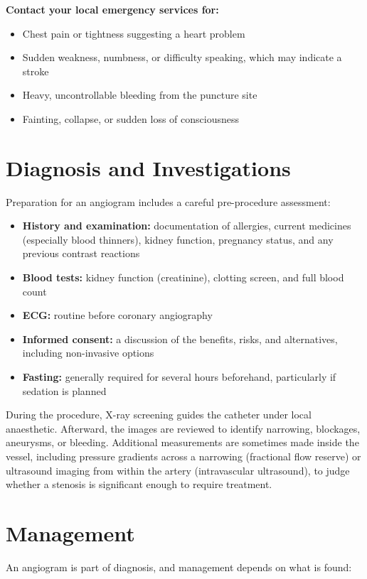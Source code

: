 \textbf{Contact your local emergency services for:}
\begin{itemize}
    \item Chest pain or tightness suggesting a heart problem
    \item Sudden weakness, numbness, or difficulty speaking, which may indicate a stroke
    \item Heavy, uncontrollable bleeding from the puncture site
    \item Fainting, collapse, or sudden loss of consciousness
\end{itemize}

\section*{Diagnosis and Investigations}
Preparation for an angiogram includes a careful pre-procedure assessment:

\begin{itemize}
    \item \textbf{History and examination:} documentation of allergies, current medicines (especially blood thinners), kidney function, pregnancy status, and any previous contrast reactions
    \item \textbf{Blood tests:} kidney function (creatinine), clotting screen, and full blood count
    \item \textbf{ECG:} routine before coronary angiography
    \item \textbf{Informed consent:} a discussion of the benefits, risks, and alternatives, including non-invasive options
    \item \textbf{Fasting:} generally required for several hours beforehand, particularly if sedation is planned
\end{itemize}

During the procedure, X-ray screening guides the catheter under local anaesthetic. Afterward, the images are reviewed to identify narrowing, blockages, aneurysms, or bleeding. Additional measurements are sometimes made inside the vessel, including pressure gradients across a narrowing (fractional flow reserve) or ultrasound imaging from within the artery (intravascular ultrasound), to judge whether a stenosis is significant enough to require treatment.

\section*{Management}
An angiogram is part of diagnosis, and management depends on what is found:

